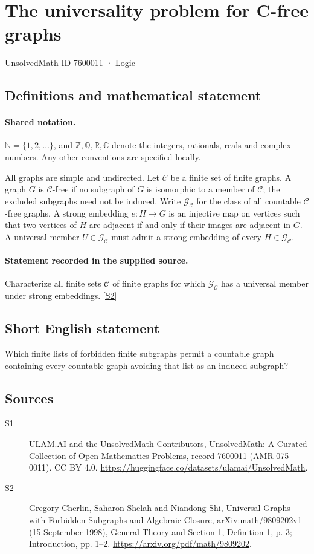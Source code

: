 \documentclass[11pt]{article}
\newcommand{\sref}[2]{\hyperlink{source:#1:#2}{[S#2]}}
\begin{document}
\setcounter{section}{7600010}
\section{The universality problem for C-free graphs}\label{7600011}
{\small\sffamily UnsolvedMath ID 7600011 · Logic}
\subsection{Definitions and mathematical statement}

\paragraph{Shared notation.}$\mathbb N=\{1,2,\ldots\}$, and $\mathbb Z,\mathbb Q,\mathbb R,\mathbb C$ denote the integers, rationals, reals and complex numbers. Any other conventions are specified locally.


All graphs are simple and undirected. Let $\mathcal C$ be a finite set of finite graphs. A graph $G$ is $\mathcal C$-free if no subgraph of $G$ is isomorphic to a member of $\mathcal C$; the excluded subgraphs need not be induced. Write $\mathcal G_{\mathcal C}$ for the class of all countable $\mathcal C$-free graphs. A strong embedding $e:H\to G$ is an injective map on vertices such that two vertices of $H$ are adjacent if and only if their images are adjacent in $G$. A universal member $U\in\mathcal G_{\mathcal C}$ must admit a strong embedding of every $H\in\mathcal G_{\mathcal C}$.
\paragraph{Statement recorded in the supplied source.}
Characterize all finite sets $\mathcal C$ of finite graphs for which $\mathcal G_{\mathcal C}$ has a universal member under strong embeddings. \sref{7600011}{2}
\subsection{Short English statement}
Which finite lists of forbidden finite subgraphs permit a countable graph containing every countable graph avoiding that list as an induced subgraph?
\subsection{Sources}
\begin{description}
\item[\hypertarget{source:7600011:1}{S1}] ULAM.AI and the UnsolvedMath Contributors, UnsolvedMath: A Curated Collection of Open Mathematics Problems, record 7600011 (AMR-075-0011). CC BY 4.0. \url{https://huggingface.co/datasets/ulamai/UnsolvedMath}.
\item[\hypertarget{source:7600011:2}{S2}] Gregory Cherlin, Saharon Shelah and Niandong Shi, Universal Graphs with Forbidden Subgraphs and Algebraic Closure, arXiv:math/9809202v1 (15 September 1998), General Theory and Section 1, Definition 1, p. 3; Introduction, pp. 1--2. \url{https://arxiv.org/pdf/math/9809202}.
\end{description}
\label{end:7600011}
\end{document}
